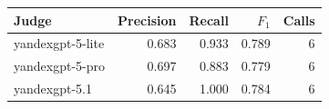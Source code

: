 \begin{tabular}{@{}lrrrr@{}}
\toprule
Judge & Precision & Recall & $F_1$ & Calls \\
\midrule
yandexgpt-5-lite & 0.683 & 0.933 & 0.789 & 6 \\
yandexgpt-5-pro & 0.697 & 0.883 & 0.779 & 6 \\
yandexgpt-5.1 & 0.645 & 1.000 & 0.784 & 6 \\
\bottomrule
\end{tabular}
